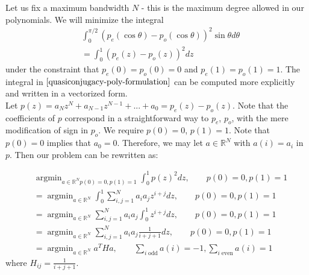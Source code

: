 \documentclass{article}
\theoremstyle{definition}
\theoremstyle{remark}
\numberwithin{equation}{section}
\DeclareMathOperator{\argmin}{argmin}
\begin{document}
Let us fix a maximum bandwidth $N$ - this is the maximum degree allowed in our polynomials. We will minimize the integral
\begin{align}
&\int_0^{\pi/2} (p_e(\cos\theta) - p_o(\cos\theta))^2 \sin\theta d\theta\\ \label{quasiconjugacy-poly-formulation}
&= \int_0^1 (p_e(z) - p_o(z))^2 dz
\end{align}
under the constraint that $p_e(0)=p_o(0) = 0$ and $p_e(1) = p_o(1) = 1$. The integral in $\ref{quasiconjugacy-poly-formulation}$ can be computed more explicitly and written in a vectorized form. \\
Let $p(z) = a_Nz^N + a_{N-1}z^{N-1} + ... + a_0 = p_e(z) - p_o(z)$. Note that the coefficients of $p$ correspond in a straightforward way to $p_e$, $p_o$, with the mere modification of sign in $p_o$. We require $p(0) = 0$, $p(1) = 1$. Note that $p(0)=0$ implies that $a_0 = 0$. Therefore, we may let  $a\in \mathbb{R}^N$ with $a(i) = a_i$ in $p$. Then our problem can be rewritten as: 

\begin{align*}
& \argmin_{a\in\mathbb{R}^N p(0)=0,p(1)=1} \int_0^1 p(z)^2 dz, \qquad p(0)=0, p(1)=1 \\
&=\argmin_{a\in\mathbb{R}^N} \int_0^1 \sum_{i,j=1}^N a_ia_j z^{i+j} dz, \qquad p(0)=0, p(1)=1\\
&= \argmin_{a\in\mathbb{R}^N} \sum_{i,j=1}^N a_ia_j \int_0^1 z^{i+j} dz, \qquad p(0)=0, p(1)=1\\
&= \argmin_{a\in\mathbb{R}^N} \sum_{i,j=1}^N a_ia_j \frac{1}{i+j+1} dz, \qquad p(0)=0, p(1)=1\\
&= \argmin_{a\in\mathbb{R}^N} a^T H a, \qquad \sum_{i \;\text{odd}} a(i) = -1, \sum_{i \;\text{even}} a(i) = 1
\end{align*} where $H_{ij} = \frac{1}{i+j+1}$. \\
\end{document}
